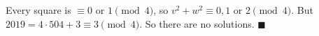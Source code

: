 Every square is $\equiv0$ or $1\pmod4$, so $v^2+w^2\equiv0,1$ or $2\pmod4$. But $2019=4\cdot504+3\equiv3\pmod4$. So there are no solutions. $\blacksquare$
